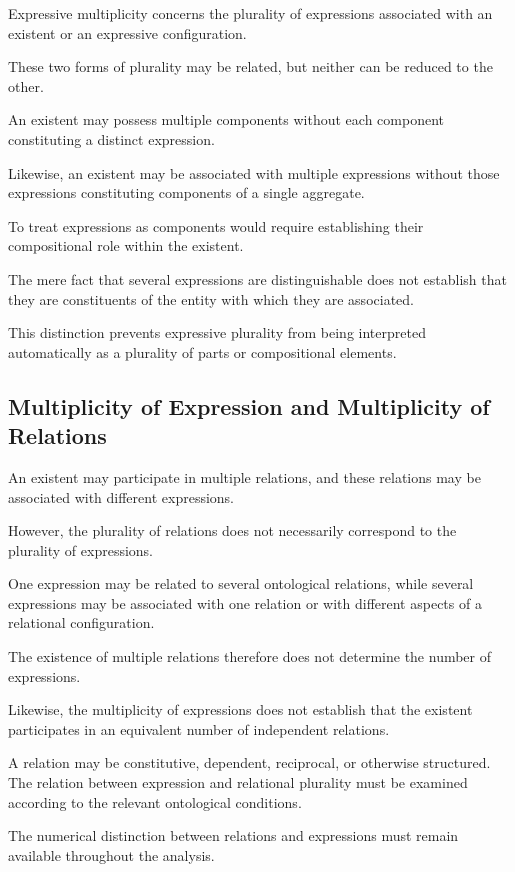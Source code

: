 Expressive multiplicity concerns the plurality
of expressions associated with an existent
or an expressive configuration.

These two forms of plurality may be related,
but neither can be reduced to the other.

An existent may possess multiple components
without each component constituting a distinct
expression.

Likewise, an existent may be associated with
multiple expressions without those expressions
constituting components of a single aggregate.

To treat expressions as components would require
establishing their compositional role within
the existent.

The mere fact that several expressions are
distinguishable does not establish that they
are constituents of the entity with which
they are associated.

This distinction prevents expressive plurality
from being interpreted automatically as
a plurality of parts or compositional elements.

\subsection{Multiplicity of Expression and Multiplicity of Relations}

An existent may participate in multiple relations,
and these relations may be associated with
different expressions.

However, the plurality of relations does not
necessarily correspond to the plurality of
expressions.

One expression may be related to several
ontological relations, while several expressions
may be associated with one relation or with
different aspects of a relational configuration.

The existence of multiple relations therefore
does not determine the number of expressions.

Likewise, the multiplicity of expressions does
not establish that the existent participates
in an equivalent number of independent relations.

A relation may be constitutive, dependent,
reciprocal, or otherwise structured.
The relation between expression and relational
plurality must be examined according to
the relevant ontological conditions.

The numerical distinction between relations
and expressions must remain available
throughout the analysis.

